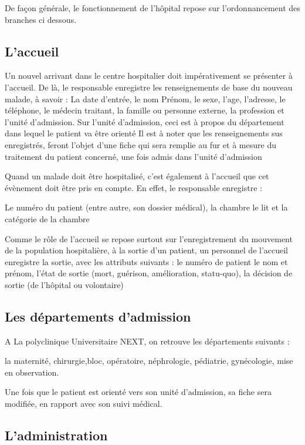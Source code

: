 	De façon générale, le fonctionnement de l'hôpital repose sur l'ordonnancement des
	branches ci dessous.
	
	\subsection{L'accueil }
	Un nouvel arrivant dans le centre hospitalier doit impérativement se présenter à l'accueil.
	De là, le responsable enregistre les renseignements de base du nouveau malade, à
	savoir :
	La date d'entrée, le nom Prénom, le sexe, l'age, l'adresse, le téléphone, le médecin traitant, la famille ou personne externe,  la profession et l'unité d'admission.
	 Sur l'unité d'admission, ceci est à propos du département dans lequel le patient va être orienté
	Il est à noter que les renseignements sus enregistrés, feront l'objet d'une fiche qui
	sera remplie au fur et à mesure du traitement du patient concerné, une fois admis
	dans l'unité d'admission
	
	\medskip
	
	Quand un malade doit être hospitalisé, c'est également à l'accueil que cet évènement
	doit être pris en compte. En effet, le responsable enregistre :
	
	Le numéro du patient (entre autre, son dossier médical), la chambre le lit et la catégorie de la chambre
	
	\medskip
	Comme le rôle de l'accueil se repose surtout sur l'enregistrement du mouvement de la	population hospitalière, à la sortie d'un patient, un personnel de l'accueil enregistre la	sortie, avec les attributs suivants :
	le numéro de patient	le nom et prénom, l'état de sortie (mort, guérison, amélioration, statu-quo), la décision de sortie (de l'hôpital ou volontaire)




\subsection{Les départements d'admission}

A La polyclinique Universitaire NEXT, on retrouve les départements suivants :

la maternité, chirurgie,bloc, opératoire,        néphrologie,  pédiatrie, gynécologie, mise en observation.

Une fois que le patient est orienté vers son unité d'admission, sa fiche sera modifiée, en
rapport avec son suivi médical.


\subsection{L'administration}

